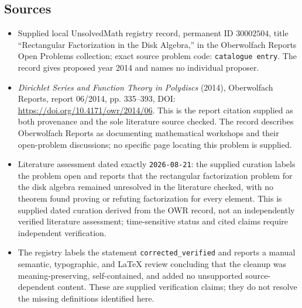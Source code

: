 \documentclass[11pt]{article}
\begin{document}
\subsection{Sources}
\begin{itemize}
\item Supplied local UnsolvedMath registry record, permanent ID \(30002504\), title ``Rectangular Factorization in the Disk Algebra,'' in the Oberwolfach Reports Open Problems collection; exact source problem code: \texttt{catalogue entry}. The record gives proposed year 2014 and names no individual proposer.
\item \emph{Dirichlet Series and Function Theory in Polydiscs} (2014), Oberwolfach Reports, report 06/2014, pp. 335--393, DOI: \url{https://doi.org/10.4171/owr/2014/06}. This is the report citation supplied as both provenance and the sole literature source checked. The record describes Oberwolfach Reports as documenting mathematical workshops and their open-problem discussions; no specific page locating this problem is supplied.
\item Literature assessment dated exactly \texttt{2026-08-21}: the supplied curation labels the problem open and reports that the rectangular factorization problem for the disk algebra remained unresolved in the literature checked, with no theorem found proving or refuting factorization for every element. This is supplied dated curation derived from the OWR record, not an independently verified literature assessment; time-sensitive status and cited claims require independent verification.
\item The registry labels the statement \texttt{corrected\_verified} and reports a manual semantic, typographic, and LaTeX review concluding that the cleanup was meaning-preserving, self-contained, and added no unsupported source-dependent content. These are supplied verification claims; they do not resolve the missing definitions identified here.
\end{itemize}
\end{document}

